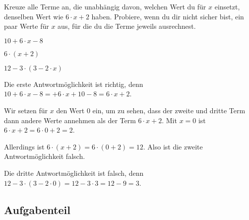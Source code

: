 \documentclass[solution]{uebungsblatt}
\begin{document}
\begin{exercise}
    Kreuze alle Terme an, die unabhängig davon, welchen Wert du für $x$ einsetzt, denselben Wert wie $6\cdot x+2$ haben. Probiere, wenn du dir nicht sicher bist, ein paar Werte für $x$ aus, für die du die Terme jeweils ausrechnest.
    \begin{multicols}{3}
        \begin{multiplechoice}
            \citem $10+6\cdot x-8$
            \item $6\cdot (x+2)$
            \item $12-3\cdot (3-2\cdot x)$
        \end{multiplechoice}
    \end{multicols}
    \begin{answerbox}[1.2in]
        Die erste Antwortmöglichkeit ist richtig, denn $10+6\cdot x-8=+6\cdot x+10-8=6\cdot x+2$.

        Wir setzen für $x$ den Wert $0$ ein, um zu sehen, dass der zweite und dritte Term dann andere Werte annehmen als der Term $6\cdot x+2$. Mit $x=0$ ist $6\cdot x+2=6\cdot 0+2=2$.
        
        Allerdings ist $6\cdot (x+2)=6\cdot (0+2)=12$. Also ist die zweite Antwortmöglichkeit falsch.

        Die dritte Antwortmöglichkeit ist falsch, denn $12-3\cdot (3-2\cdot 0)=12-3\cdot 3=12-9=3$.
    \end{answerbox}
\end{exercise}


\subsection*{Aufgabenteil}
\end{document}
